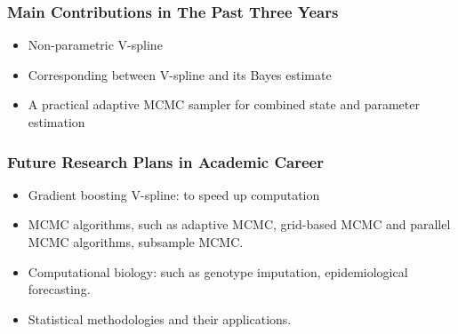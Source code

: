 \documentclass{beamer}
\begin{document}
%
%
%
%
%


\begin{frame}
\frametitle{Main Contributions in The Past Three Years}
\begin{itemize}
\item Non-parametric V-spline
\item Corresponding between V-spline and its Bayes estimate
\item A practical adaptive MCMC sampler for combined state and parameter estimation
\end{itemize}

\end{frame}


\begin{frame}
\frametitle{Future Research Plans in Academic Career}
\begin{itemize}
\item Gradient boosting V-spline: to speed up computation

\item MCMC algorithms, such as adaptive MCMC, grid-based MCMC and parallel MCMC algorithms, subsample MCMC. 

\item Computational biology: such as genotype imputation, epidemiological forecasting. 

\item Statistical methodologies and their applications.  

\end{itemize}

\end{frame}



\end{document}
